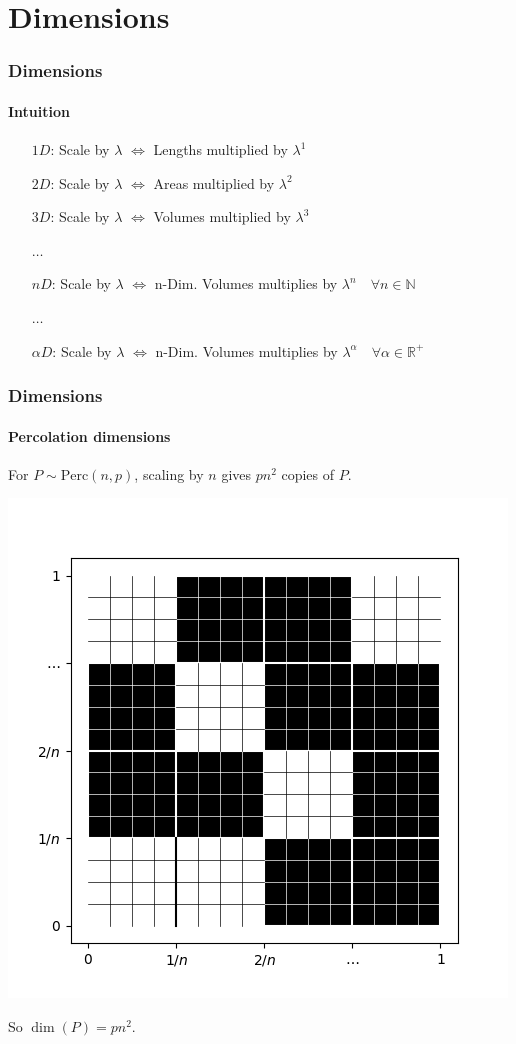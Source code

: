 \documentclass{beamer}
\newcommand{\perc}[2]{\text{Perc}\left( #1, #2 \right)}
\newcommand{\N}{\mathbb{N}}
\newcommand{\R}{\mathbb{R}}
\begin{document}
	\section{Dimensions}
	\begin{frame}
		\frametitle{Dimensions}
		\framesubtitle{Intuition}
		\begin{itemize}
			\pause
			\item[$1D$:] Scale by $\lambda$ $\iff$ Lengths multiplied by $\lambda^1$
			\pause
			\item[$2D$:] Scale by $\lambda$ $\iff$ Areas multiplied by $\lambda^2$
			\pause
			\item[$3D$:] Scale by $\lambda$ $\iff$ Volumes multiplied by $\lambda^3$
			\pause
			\item[$\dots$]
			\item[$nD$:] Scale by $\lambda$ $\iff$ n-Dim. Volumes multiplies by $\lambda^n \quad \forall n \in \N$
			\pause
			\item[\color{purple} $\dots$]
			\item[\color{red} $\alpha D$:] \color{brickred} Scale by $\lambda$ $\iff$ n-Dim. Volumes multiplies by $\lambda^{\alpha} \quad \forall \alpha \in \R^+$
		\end{itemize}
	\end{frame}
	\begin{frame}
		\frametitle{Dimensions}
		\framesubtitle{Percolation dimensions}
		For $P \sim \perc{n}{p}$, scaling by $n$ gives $pn^2$ copies of $P$.
		\begin{center}
			\includegraphics[scale=0.4]{imgs/perc_fig2.png}
		\end{center}
		So $\dim(P) = pn^2$.
		
	\end{frame}
	
\end{document}
